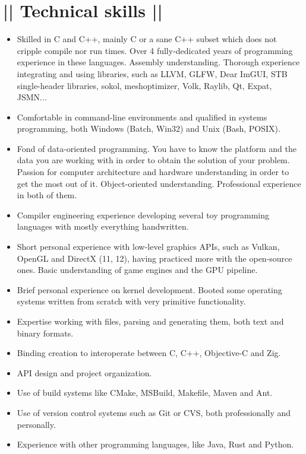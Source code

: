 \section*{|| Technical skills ||}
\begin{itemize}
	\item Skilled in C and C++, mainly C or a sane C++ subset which does not cripple compile nor run times. Over 4 fully-dedicated years of programming experience in these languages. Assembly understanding. Thorough experience integrating and using libraries, such as LLVM, GLFW, Dear ImGUI, STB single-header libraries, sokol, meshoptimizer, Volk, Raylib, Qt, Expat, JSMN...
	\item Comfortable in command-line environments and qualified in systems programming, both Windows (Batch, Win32) and Unix (Bash, POSIX).
	\item Fond of data-oriented programming. You have to know the platform and the data you are working with in order to obtain the solution of your problem. Passion for computer architecture and hardware understanding in order to get the most out of it. Object-oriented understanding. Professional experience in both of them.
	\item Compiler engineering experience developing several toy programming languages with mostly everything handwritten.
	\item Short personal experience with low-level graphics APIs, such as Vulkan, OpenGL and DirectX (11, 12), having practiced more with the open-source ones. Basic understanding of game engines and the GPU pipeline.
	\item Brief personal experience on kernel development. Booted some operating systems written from scratch with very primitive functionality.
	\item Expertise working with files, parsing and generating them, both text and binary formats.
	\item Binding creation to interoperate between C, C++, Objective-C and Zig.
	\item API design and project organization.
	\item Use of build systems like CMake, MSBuild, Makefile, Maven and Ant.
	\item Use of version control systems such as Git or CVS, both professionally and personally.

	\item Experience with other programming languages, like Java, Rust and Python.
\end{itemize}